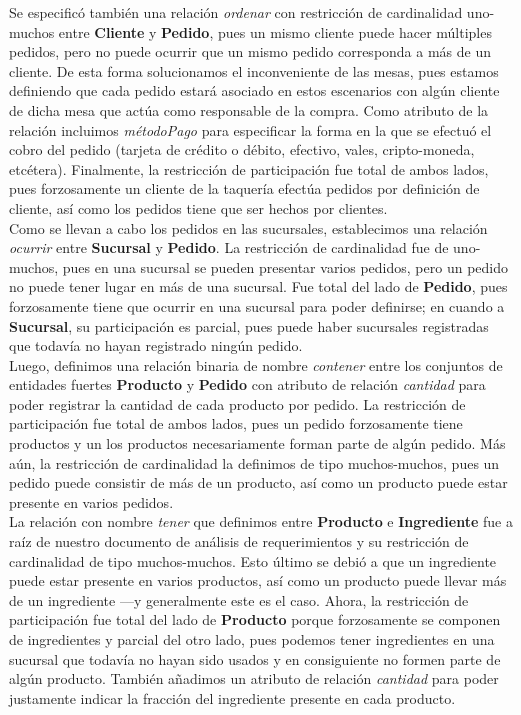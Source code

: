 \documentclass[11pt,letterpaper]{article}
\begin{document}
Se especificó también una relación \textit{ordenar} con restricción de cardinalidad uno-muchos entre \textbf{Cliente} y \textbf{Pedido}, pues un mismo cliente puede hacer múltiples pedidos, pero no puede ocurrir que un mismo pedido corresponda a más de un cliente. De esta forma solucionamos el inconveniente de las mesas, pues estamos definiendo que cada pedido estará asociado en estos escenarios con algún cliente de dicha mesa que actúa como responsable de la compra. Como atributo de la relación incluimos \textit{métodoPago} para especificar la forma en la que se efectuó el cobro del pedido (tarjeta de crédito o débito, efectivo, vales, cripto-moneda, etcétera). Finalmente, la restricción de participación fue total de ambos lados, pues forzosamente un cliente de la taquería efectúa pedidos por definición de cliente, así como los pedidos tiene que ser hechos por clientes.\\

Como se llevan a cabo los pedidos en las sucursales, establecimos una relación \textit{ocurrir} entre \textbf{Sucursal} y \textbf{Pedido}. La restricción de cardinalidad fue de uno-muchos, pues en una sucursal se pueden presentar varios pedidos, pero un pedido no puede tener lugar en más de una sucursal. Fue total del lado de \textbf{Pedido}, pues forzosamente tiene que ocurrir en una sucursal para poder definirse; en cuando a \textbf{Sucursal}, su participación es parcial, pues puede haber sucursales registradas que todavía no hayan registrado ningún pedido. \\

Luego, definimos una relación binaria de nombre \textit{contener} entre los conjuntos de entidades  fuertes \textbf{Producto} y \textbf{Pedido} con atributo de relación \textit{cantidad} para poder registrar la cantidad de cada producto por pedido. La restricción de participación fue total de ambos lados, pues un pedido forzosamente tiene productos y un los productos necesariamente forman parte de algún pedido. Más aún, la restricción de cardinalidad la definimos de tipo muchos-muchos, pues un pedido puede consistir de más de un producto, así como un producto puede estar presente en varios pedidos.\\

La relación con nombre \textit{tener} que definimos entre \textbf{Producto} e \textbf{Ingrediente} fue a raíz de nuestro documento de análisis de requerimientos y su restricción de cardinalidad de tipo muchos-muchos. Esto último se debió a que un ingrediente puede estar presente en varios productos, así como un producto puede llevar más de un ingrediente ---y generalmente este es el caso. Ahora, la restricción de participación fue total del lado de \textbf{Producto} porque forzosamente se componen de ingredientes y parcial del otro lado, pues podemos tener ingredientes en una sucursal que todavía no hayan sido usados y en consiguiente no formen parte de algún producto. También añadimos un atributo de relación \textit{cantidad} para poder justamente indicar la fracción del ingrediente presente en cada producto.\\
\end{document}
